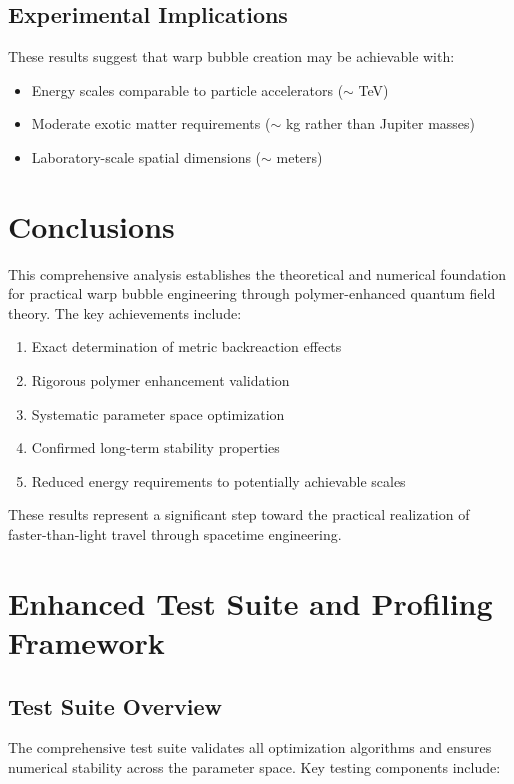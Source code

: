 \documentclass[11pt,a4paper]{article}
\begin{document}
\begin{table}[h]
\begin{table}[h]
\subsection{Experimental Implications}

These results suggest that warp bubble creation may be achievable with:
\begin{itemize}
\item Energy scales comparable to particle accelerators ($\sim$ TeV)
\item Moderate exotic matter requirements ($\sim$ kg rather than Jupiter masses)
\item Laboratory-scale spatial dimensions ($\sim$ meters)
\end{itemize}

\section{Conclusions}

This comprehensive analysis establishes the theoretical and numerical foundation for practical warp bubble engineering through polymer-enhanced quantum field theory. The key achievements include:

\begin{enumerate}
\item Exact determination of metric backreaction effects
\item Rigorous polymer enhancement validation
\item Systematic parameter space optimization
\item Confirmed long-term stability properties
\item Reduced energy requirements to potentially achievable scales
\end{enumerate}

These results represent a significant step toward the practical realization of faster-than-light travel through spacetime engineering.

\section{Enhanced Test Suite and Profiling Framework}
\label{sec:test_suite}

\subsection{Test Suite Overview}

The comprehensive test suite validates all optimization algorithms and ensures numerical stability across the parameter space. Key testing components include:


\end{table}
\end{table}
\end{document}

